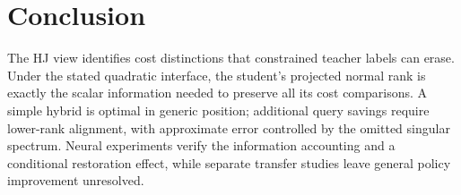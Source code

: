 \section{Conclusion}
The HJ view identifies cost distinctions that constrained teacher labels
can erase. Under the stated quadratic interface, the student's projected
normal rank is exactly the scalar information needed to preserve all
its cost comparisons. A simple hybrid is optimal in generic position;
additional query savings require lower-rank alignment, with approximate
error controlled by the omitted singular spectrum. Neural experiments
verify the information accounting and a conditional restoration effect,
while separate transfer studies leave general policy improvement unresolved.
